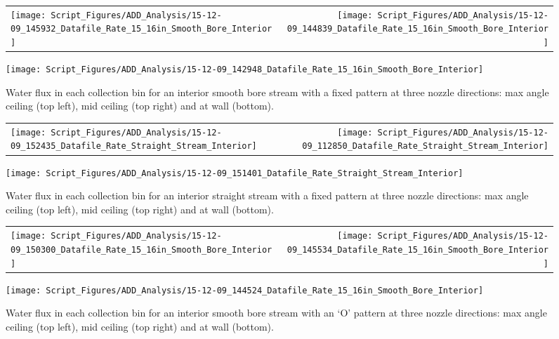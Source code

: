 \documentclass[12pt,oneside]{book}
\begin{document}
\begin{figure}[ht]
\begin{tabular*}{\textwidth}{lr}
\texttt{[image: Script\_Figures/ADD\_Analysis/15-12-09\_145932\_Datafile\_Rate\_15\_16in\_Smooth\_Bore\_Interior]} &
\texttt{[image: Script\_Figures/ADD\_Analysis/15-12-09\_144839\_Datafile\_Rate\_15\_16in\_Smooth\_Bore\_Interior]} \\
\end{tabular*}
\centering
\texttt{[image: Script\_Figures/ADD\_Analysis/15-12-09\_142948\_Datafile\_Rate\_15\_16in\_Smooth\_Bore\_Interior]}
\caption[Water Flux for Varying Nozzle Direction with Fixed Interior Smooth Bore Stream]{Water flux in each collection bin for an interior smooth bore stream with a fixed pattern at three nozzle directions: max angle ceiling (top left), mid ceiling (top right) and at wall (bottom).}
\label{fig:Interior_Varying_Nozzle_Direction_SB_Fixed_Pattern}
\end{figure}

\begin{figure}[ht]
\begin{tabular*}{\textwidth}{lr}
\texttt{[image: Script\_Figures/ADD\_Analysis/15-12-09\_152435\_Datafile\_Rate\_Straight\_Stream\_Interior]} &
\texttt{[image: Script\_Figures/ADD\_Analysis/15-12-09\_112850\_Datafile\_Rate\_Straight\_Stream\_Interior]} \\
\end{tabular*}
\centering
\texttt{[image: Script\_Figures/ADD\_Analysis/15-12-09\_151401\_Datafile\_Rate\_Straight\_Stream\_Interior]} 
\caption[Water Flux for Varying Nozzle Direction with Fixed Interior Straight Stream]{Water flux in each collection bin for an interior straight stream with a fixed pattern at three nozzle directions: max angle ceiling (top left), mid ceiling (top right) and at wall (bottom).}
\label{fig:Interior_Varying_Nozzle_Direction_SS_Fixed_Pattern}
\end{figure}

\begin{figure}[ht]
\begin{tabular*}{\textwidth}{lr}
\texttt{[image: Script\_Figures/ADD\_Analysis/15-12-09\_150300\_Datafile\_Rate\_15\_16in\_Smooth\_Bore\_Interior]} &
\texttt{[image: Script\_Figures/ADD\_Analysis/15-12-09\_145534\_Datafile\_Rate\_15\_16in\_Smooth\_Bore\_Interior]} \\
\end{tabular*}
\centering
\texttt{[image: Script\_Figures/ADD\_Analysis/15-12-09\_144524\_Datafile\_Rate\_15\_16in\_Smooth\_Bore\_Interior]}
\caption[Water Flux for Varying Nozzle Direction with `O' Pattern Interior Smooth Bore Stream]{Water flux in each collection bin for an interior smooth bore stream with an `O' pattern at three nozzle directions: max angle ceiling (top left), mid ceiling (top right) and at wall (bottom).}
\label{fig:Interior_Varying_Nozzle_Direction_SB_O_Pattern}
\end{figure}
\end{document}
